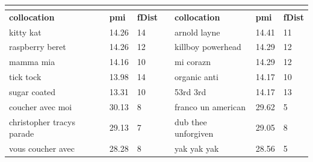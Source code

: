 \documentclass[a4paper,12pt]{article}
\begin{document}
\begin{table}[]
\centering
\label{tab:top_collocation}
\begin{tabular}{|l|l|l|l|l|l|l|}
\hline
\rowcolor[HTML]{C0C0C0} 
\multicolumn{3}{|c|}{\cellcolor[HTML]{C0C0C0}{\color[HTML]{000000} \textbf{POP}}} & {\color[HTML]{000000} } & \multicolumn{3}{c|}{\cellcolor[HTML]{C0C0C0}{\color[HTML]{000000} \textbf{ROCK}}} \\ \hline
\rowcolor[HTML]{C0C0C0} 
\textbf{collocation}           & \textbf{pmi}      & \textbf{fDist}     &                         & \textbf{collocation}        & \textbf{pmi}       & \textbf{fDist}       \\ \hline
kitty kat                      & 14.26                   & 14                     &                         & arnold layne                & 14.41                    & 11                       \\ \hline
raspberry beret                & 14.26                   & 12                     &                         & killboy powerhead           & 14.29                    & 12                       \\ \hline
mamma mia                      & 14.16                   & 10                     &                         & mi corazn                   & 14.29                    & 12                       \\ \hline
tick tock                      & 13.98                   & 14                     &                         & organic anti                & 14.17                    & 10                       \\ \hline
sugar coated                   & 13.31                   & 10                     &                         & 53rd 3rd                    & 14.17                    & 13                       \\ \hline
\rowcolor[HTML]{EFEFEF} 
coucher avec moi               & 30.13                   & 8                      &                         & franco un american          & 29.62                    & 5                        \\ \hline
\rowcolor[HTML]{EFEFEF} 
christopher tracys parade      & 29.13                   & 7                      &                         & dub thee unforgiven         & 29.05                    & 8                        \\ \hline
\rowcolor[HTML]{EFEFEF} 
vous coucher avec              & 28.28                   & 8                      &                         & yak yak yak                 & 28.56                    & 5                        \\ \hline

\end{tabular}
\end{table}
\end{document}
